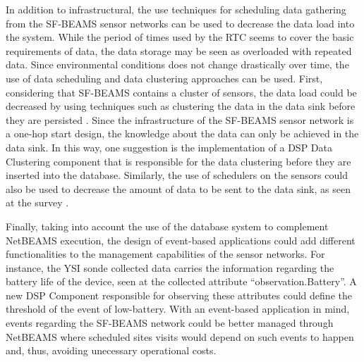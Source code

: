 In addition to infrastructural, the use techniques for scheduling data
gathering from the SF-BEAMS sensor networks can be used to decrease the data
load into the system. While the period of times used by the RTC seems
to cover the basic requirements of data, the data storage may be
seen as overloaded with repeated data. Since environmental conditions
does not change drastically over time, the use of data scheduling and
data clustering approaches can be used. First, considering that SF-BEAMS
contains a cluster of sensors, the data load could be decreased by using
techniques such as clustering the data in the data sink before they are
persisted \cite{sn-time-series, sn-schedule-minimal-aggregation-time}. Since
the infrastructure of the SF-BEAMS sensor network is a one-hop start design,
the knowledge about the data can only be achieved in the data sink. In this
way, one suggestion is the implementation of a DSP Data Clustering component
that is responsible for the data clustering before they are inserted into the
database. Similarly, the use of schedulers on the sensors could also be used to
decrease the amount of data to be sent to the data sink, as seen at the survey
\cite{sn-scheduling-survey}. 

Finally, taking into account the use of the database system to complement
NetBEAMS execution, the design of event-based applications could add different
functionalities to the management capabilities of the sensor networks. For
instance, the YSI sonde collected data carries the information regarding the
battery life of the device, seen at the collected attribute 
``observation.Battery''. A new DSP Component responsible for observing these
attributes could define the threshold of the event of low-battery. With an
event-based application in mind, events regarding the SF-BEAMS network could be
better managed through NetBEAMS where scheduled sites visits would depend on
such events to happen and, thus, avoiding unecessary operational costs.